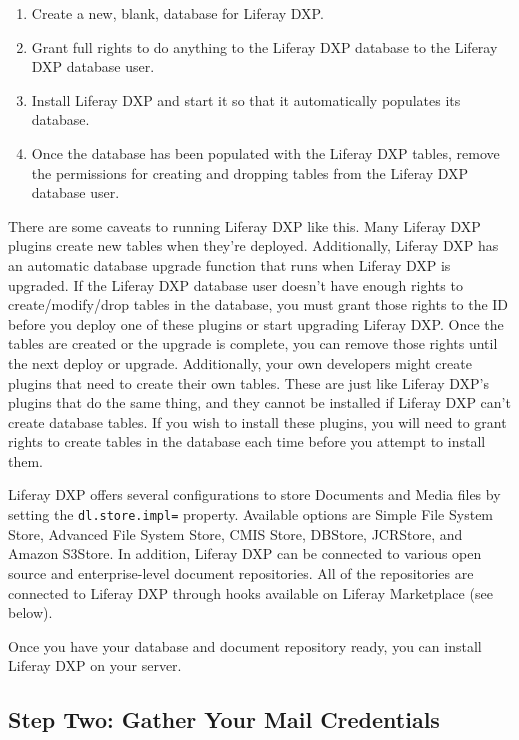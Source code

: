 \begin{enumerate}
\def\labelenumi{\arabic{enumi}.}
\item
  Create a new, blank, database for Liferay DXP.
\item
  Grant full rights to do anything to the Liferay DXP database to the
  Liferay DXP database user.
\item
  Install Liferay DXP and start it so that it automatically populates
  its database.
\item
  Once the database has been populated with the Liferay DXP tables,
  remove the permissions for creating and dropping tables from the
  Liferay DXP database user.
\end{enumerate}

There are some caveats to running Liferay DXP like this. Many Liferay DXP
plugins create new tables when they're deployed. Additionally, Liferay
DXP has an automatic database upgrade function that runs when Liferay
DXP is upgraded. If the Liferay DXP database user doesn't have enough
rights to create/modify/drop tables in the database, you must grant
those rights to the ID before you deploy one of these plugins or start
upgrading Liferay DXP. Once the tables are created or the upgrade is
complete, you can remove those rights until the next deploy or upgrade.
Additionally, your own developers might create plugins that need to
create their own tables. These are just like Liferay DXP's plugins that
do the same thing, and they cannot be installed if Liferay DXP can't
create database tables. If you wish to install these plugins, you will
need to grant rights to create tables in the database each time before
you attempt to install them.

Liferay DXP offers several configurations to store Documents and Media
files by setting the \texttt{dl.store.impl=} property. Available options
are Simple File System Store, Advanced File System Store, CMIS Store,
DBStore, JCRStore, and Amazon S3Store. In addition, Liferay DXP can be
connected to various open source and enterprise-level document
repositories. All of the repositories are connected to Liferay DXP
through hooks available on Liferay Marketplace (see below).

Once you have your database and document repository ready, you can
install Liferay DXP on your server.

\subsection{Step Two: Gather Your Mail
Credentials}\label{step-two-gather-your-mail-credentials}

